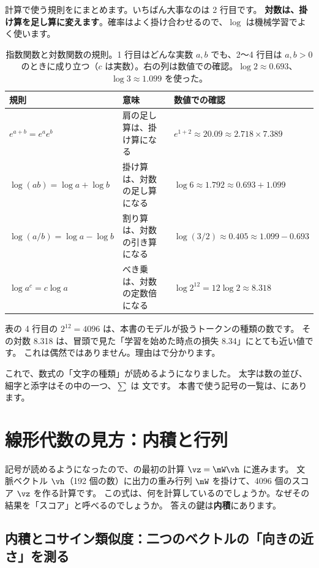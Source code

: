 計算で使う規則をにまとめます。いちばん大事なのは 2 行目です。
\textbf{対数は、掛け算を足し算に変えます}。確率はよく掛け合わせるので、$\log$ は機械学習でよく使います。

\begin{table}[tbp]
\centering
\caption{指数関数と対数関数の規則。1 行目はどんな実数 $a,b$ でも、2〜4 行目は $a,b>0$ のときに成り立つ（$c$ は実数）。右の列は数値での確認。$\log 2\approx 0.693$、$\log 3\approx 1.099$ を使った。}
\label{tab:math-explog}
\small
\begin{tabular}{@{}lll@{}}
\toprule
規則 & 意味 & 数値での確認 \\
\midrule
$e^{a+b}=e^{a}e^{b}$ & 肩の足し算は、掛け算になる & $e^{1+2}\approx 20.09\approx 2.718\times 7.389$ \\
$\log(ab)=\log a+\log b$ & 掛け算は、対数の足し算になる & $\log 6\approx 1.792\approx 0.693+1.099$ \\
$\log(a/b)=\log a-\log b$ & 割り算は、対数の引き算になる & $\log(3/2)\approx 0.405\approx 1.099-0.693$ \\
$\log a^{c}=c\log a$ & べき乗は、対数の定数倍になる & $\log 2^{12}=12\log 2\approx 8.318$ \\
\bottomrule
\end{tabular}
\end{table}

表の 4 行目の $2^{12}=4096$ は、本書のモデルが扱うトークンの種類の数です。
その対数 8.318 は、冒頭で見た「学習を始めた時点の損失 8.34」にとても近い値です。
これは偶然ではありません。理由はで分かります。

これで、数式の「文字の種類」が読めるようになりました。
太字は数の並び、細字と添字はその中の一つ、$\sum$ は  文です。
本書で使う記号の一覧は、にあります。

\section{線形代数の見方：内積と行列}\label{sec:math-linalg}

記号が読めるようになったので、の最初の計算 $\vz=\mW\vh$ に進みます。
文脈ベクトル $\vh$（192 個の数）に出力の重み行列 $\mW$ を掛けて、4096 個のスコア $\vz$ を作る計算です。
この式は、何を計算しているのでしょうか。なぜその結果を「スコア」と呼べるのでしょうか。
答えの鍵は\textbf{内積}にあります。

\subsection*{内積とコサイン類似度：二つのベクトルの「向きの近さ」を測る}


